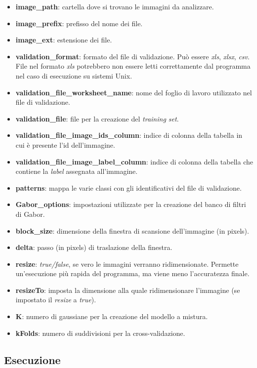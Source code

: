 \begin{itemize}
\item \textbf{image\_path}: cartella dove si trovano le immagini da analizzare.
\item \textbf{image\_prefix}: prefisso del nome dei file.
\item \textbf{image\_ext}: estensione dei file.
\item \textbf{validation\_format}: formato del file di validazione. Può essere \emph{xls}, \emph{xlsx}, \emph{csv}. File nel formato \emph{xls} potrebbero non essere letti correttamente dal programma nel caso di esecuzione su sistemi Unix. 
\item \textbf{validation\_file\_worksheet\_name}: nome del foglio di lavoro utilizzato nel file di validazione.
\item \textbf{validation\_file}: file per la creazione del \emph{training set}.
\item \textbf{validation\_file\_image\_ids\_column}: indice di colonna della tabella in cui è presente l'id dell'immagine.
\item \textbf{validation\_file\_image\_label\_column}: indice di colonna della tabella che contiene la \emph{label} assegnata all'immagine.
\item \textbf{patterns}: mappa le varie classi con gli identificativi del file di validazione.
\item \textbf{Gabor\_options}: impostazioni utilizzate per la creazione del banco di filtri di Gabor.
\item \textbf{block\_size}: dimensione della finestra di scansione dell'immagine (in pixels).
\item \textbf{delta}: passo (in pixels) di traslazione della finestra.
\item \textbf{resize}: \emph{true/false}, se vero le immagini verranno ridimensionate. Permette un'esecuzione più rapida del programma, ma viene meno l'accuratezza finale.
\item \textbf{resizeTo}: imposta la dimensione alla quale ridimensionare l'immagine (se impostato il \emph{resize} a \emph{true}).
\item \textbf{K}: numero di gaussiane per la creazione del modello a mistura.
\item \textbf{kFolds}: numero di suddivisioni per la cross-validazione.
\end{itemize}

\subsection{Esecuzione}

